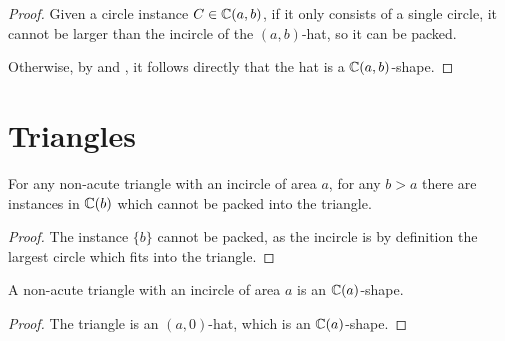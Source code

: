 \documentclass[%
    a4paper,              %
    style=screen,          %
    bibliography=totoc,   %
    nexus,                %
    lnum,                 %
    extramargin,          %
]{tubsbook}
\begin{document}
\begin{proof}
    Given a circle instance $C \in \mathbb{C}(a,b)$, if it only consists of a single circle, it cannot be larger than the incircle of the $(a,b)$-hat, so it can be packed.

    Otherwise, by  and , it follows directly that the hat is a $\mathbb{C}(a,b)$-shape.
\end{proof}

\chapter{Triangles}

\begin{theorem}
    For any non-acute triangle with an incircle of area $a$, for any $b > a$ there are instances in $\mathbb{C}(b)$ which cannot be packed into the triangle.
\end{theorem}

\begin{proof}
    The instance $\{b\}$ cannot be packed, as the incircle is by definition the largest circle which fits into the triangle.
\end{proof}

\begin{theorem}
    A non-acute triangle with an incircle of area $a$ is an $\mathbb{C}(a)$-shape.
\end{theorem}

\begin{proof}
    The triangle is an $(a,0)$-hat, which is an $\mathbb{C}(a)$-shape.
\end{proof}
\end{document}
